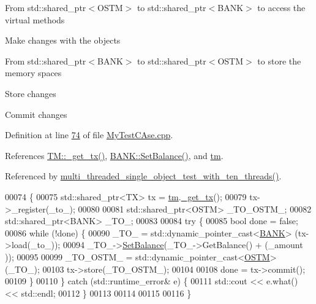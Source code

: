 From std\+::shared\+\_\+ptr$<$\+O\+S\+T\+M$>$ to std\+::shared\+\_\+ptr$<$\+B\+A\+N\+K$>$ to access the virtual methods

Make changes with the objects

From std\+::shared\+\_\+ptr$<$\+B\+A\+N\+K$>$ to std\+::shared\+\_\+ptr$<$\+O\+S\+T\+M$>$ to store the memory spaces

Store changes

Commit changes

Definition at line \hyperlink{_my_test_c_ase_8cpp_source_l00074}{74} of file \hyperlink{_my_test_c_ase_8cpp_source}{My\+Test\+C\+Ase.\+cpp}.



References \hyperlink{_t_m_8cpp_source_l00079}{T\+M\+::\+\_\+get\+\_\+tx()}, \hyperlink{_b_a_n_k_8h_source_l00046}{B\+A\+N\+K\+::\+Set\+Balance()}, and \hyperlink{_my_test_c_ase_8h_source_l00065}{tm}.



Referenced by \hyperlink{_my_test_c_ase_8cpp_source_l00954}{multi\+\_\+threaded\+\_\+single\+\_\+object\+\_\+test\+\_\+with\+\_\+ten\+\_\+threads()}.


\begin{DoxyCode}
00074                                                                                         \{
00075      std::shared\_ptr<TX> tx = \hyperlink{class_my_test_c_ase_a422e6e5d4ddedea384be96031c89b72b_a422e6e5d4ddedea384be96031c89b72b}{tm}.\hyperlink{class_t_m_a41cb0226cc4080c931651b13f74a0075_a41cb0226cc4080c931651b13f74a0075}{\_get\_tx}();
00079     tx->\_register(\_to\_);
00080     
00081     std::shared\_ptr<OSTM> \_TO\_OSTM\_;
00082     std::shared\_ptr<BANK> \_TO\_;
00083     
00084     \textcolor{keywordflow}{try} \{
00085         \textcolor{keywordtype}{bool} done = \textcolor{keyword}{false};
00086         \textcolor{keywordflow}{while} (!done) \{
00090             \_TO\_ = std::dynamic\_pointer\_cast<\hyperlink{class_b_a_n_k}{BANK}> (tx->load(\_to\_));
00094             \_TO\_->\hyperlink{class_b_a_n_k_ae3e45b407bf8ec7175662442ea24b7c0_ae3e45b407bf8ec7175662442ea24b7c0}{SetBalance}(\_TO\_->GetBalance() + (\_amount ));
00095 
00099             \_TO\_OSTM\_ = std::dynamic\_pointer\_cast<\hyperlink{class_o_s_t_m}{OSTM}> (\_TO\_);
00103             tx->store(\_TO\_OSTM\_);
00104 
00108             done = tx->commit();
00109         \}
00110     \} \textcolor{keywordflow}{catch} (std::runtime\_error& e) \{
00111         std::cout << e.what() << std::endl;
00112     \}
00113     
00114     
00115     
00116 \}
\end{DoxyCode}


